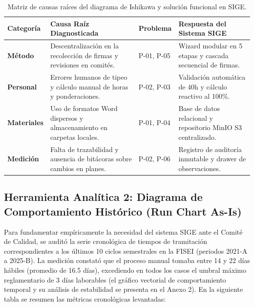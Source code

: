 \documentclass[12pt,a4paper]{article}
\begin{document}
\begin{table}[H]
\centering
\small
\renewcommand{\arraystretch}{1.15}
\begin{tabularx}{\textwidth}{|>{\hsize=0.8\hsize\raggedright\arraybackslash\bfseries\footnotesize}X|>{\hsize=1.4\hsize\raggedright\arraybackslash\footnotesize}X|>{\hsize=0.4\hsize\centering\arraybackslash\footnotesize}X|>{\hsize=1.4\hsize\raggedright\arraybackslash\footnotesize}X|}
\hline
\rowcolor{tableheader}
\textbf{Categoría} & \textbf{Causa Raíz Diagnosticada} & \textbf{Problema} & \textbf{Respuesta del Sistema SIGE} \\
\hline
\textbf{Método} & Descentralización en la recolección de firmas y revisiones en comités. & P-01, P-05 & Wizard modular en 5 etapas y cascada secuencial de firmas. \\
\hline
\textbf{Personal} & Errores humanos de tipeo y cálculo manual de horas y ponderaciones. & P-02, P-03 & Validación automática de 40h y cálculo reactivo al 100\%. \\
\hline
\textbf{Materiales} & Uso de formatos Word dispersos y almacenamiento en carpetas locales. & P-01, P-04 & Base de datos relacional y repositorio MinIO S3 centralizado. \\
\hline
\textbf{Medición} & Falta de trazabilidad y ausencia de bitácoras sobre cambios en planes. & P-02, P-06 & Registro de auditoría inmutable y drawer de observaciones. \\
\hline
\end{tabularx}
\caption{Matriz de causas raíces del diagrama de Ishikawa y solución funcional en SIGE.}
\label{tab:causas_ishikawa}
\end{table}

\subsection{Herramienta Analítica 2: Diagrama de Comportamiento Histórico (Run Chart As-Is)}
Para fundamentar empíricamente la necesidad del sistema SIGE ante el Comité de Calidad, se auditó la serie cronológica de tiempos de tramitación correspondientes a los últimos 10 ciclos semestrales en la FISEI (periodos 2021-A a 2025-B). La medición constató que el proceso manual tomaba entre 14 y 22 días hábiles (promedio de 16.5 días), excediendo en todos los casos el umbral máximo reglamentario de 3 días laborables (el gráfico vectorial de comportamiento temporal y su análisis de estabilidad se presenta en el Anexo 2). En la siguiente tabla se resumen las métricas cronológicas levantadas:
\end{document}
